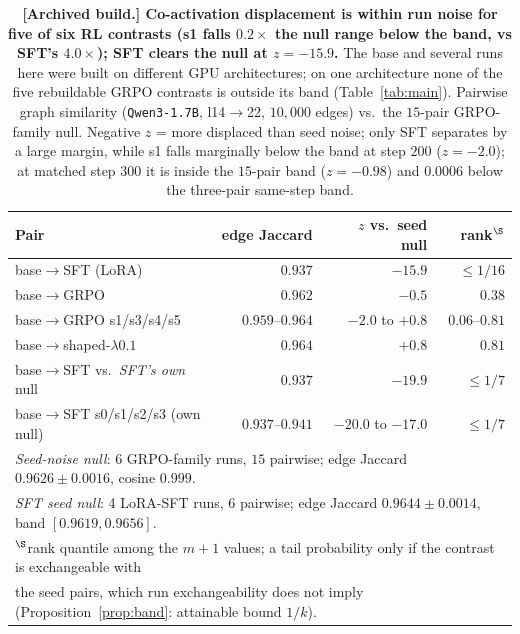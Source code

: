 \documentclass{article}
\begin{document}
\begin{table}[h]
\centering
\caption{\textbf{[Archived build.] Co-activation displacement is within run noise for five of six RL contrasts (s1 falls $0.2\times$ the null range below the band, vs SFT's $4.0\times$); SFT clears the null at $z=-15.9$.} The base and several runs here were built on different GPU architectures; on one architecture none of the five rebuildable GRPO contrasts is outside its band (Table~\ref{tab:main}). Pairwise graph similarity (\texttt{Qwen3-1.7B}, l14$\to$22, $10{,}000$ edges) vs.\ the $15$-pair GRPO-family null. Negative $z$ = more displaced than seed noise; only SFT separates by a large margin, while s1 falls marginally below the band at step $200$ ($z=-2.0$); at matched step $300$ it is inside the $15$-pair band ($z=-0.98$) and $0.0006$ below the three-pair same-step band.}
\label{tab:rewiring}
\small
\begin{tabular}{lrrr}
\toprule
Pair & edge Jaccard & $z$ vs.\ seed null & rank$^{\S}$ \\
\midrule
base$\to$SFT (LoRA)   & $\mathbf{0.937}$ & $\mathbf{-15.9}$ & $\le1/16$ \\
base$\to$GRPO         & $0.962$ & $-0.5$ & $0.38$ \\
base$\to$GRPO s1/s3/s4/s5 & $0.959$--$0.964$ & $-2.0$ to $+0.8$ & $0.06$--$0.81$ \\
base$\to$shaped-$\lambda0.1$ & $0.964$ & $+0.8$ & $0.81$ \\
\midrule
\midrule
base$\to$SFT vs.\ \emph{SFT's own} null & $\mathbf{0.937}$ & $\mathbf{-19.9}$ & $\le1/7$ \\
base$\to$SFT s0/s1/s2/s3 (own null) & $0.937$--$0.941$ & $-20.0$ to $-17.0$ & $\le1/7$ \\
\midrule
\multicolumn{4}{l}{\emph{Seed-noise null}: 6 GRPO-family runs, $15$ pairwise; edge Jaccard $0.9626\pm0.0016$, cosine $0.999$.} \\
\multicolumn{4}{l}{\emph{SFT seed null}: 4 LoRA-SFT runs, $6$ pairwise; edge Jaccard $0.9644\pm0.0014$, band $[0.9619,0.9656]$.} \\
\multicolumn{4}{l}{\footnotesize $^{\S}$rank quantile among the $m{+}1$ values; a tail probability only if the contrast is exchangeable with} \\
\multicolumn{4}{l}{\footnotesize the seed pairs, which run exchangeability does not imply (Proposition~\ref{prop:band}: attainable bound $1/k$).} \\
\bottomrule
\end{tabular}
\end{table}
\end{document}
